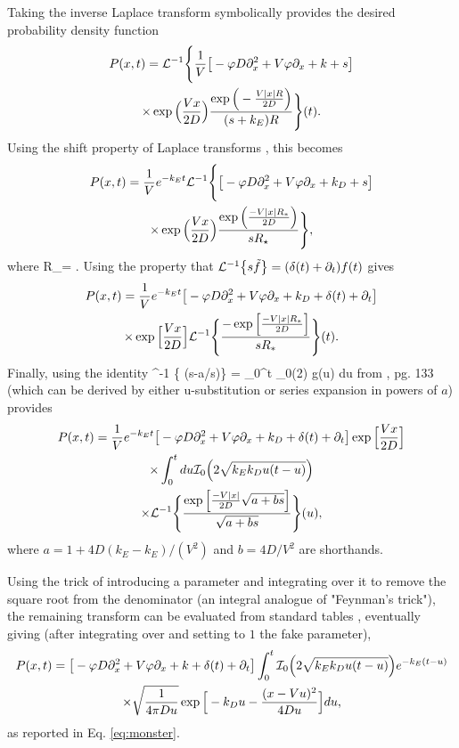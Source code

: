 Taking the inverse Laplace transform symbolically provides the desired probability density function
\begin{multline} P(x,t) = \mathcal{L}^{-1}\Bigg\{ \frac{1}{V} \big[-\varphi D\partial_x^2 + V\varphi \partial_x + k + s \big] \\ \times \exp\Big(\frac{Vx}{2D}\Big) \frac{\exp\Big(-\frac{V|x|R}{2D} \Big)}{(s+k_E)R} \Bigg\}(t). \end{multline}
Using the shift property of Laplace transforms \citep[e.g.][]{Arfken1985}, this becomes
\begin{multline} P(x,t) = \frac{1}{V}e^{-k_E t} \mathcal{L}^{-1}\Bigg\{ \big[-\varphi D\partial_x^2 + V \varphi \partial_x + k_D + s\big] \\ \times \exp\Big(\frac{Vx}{2D}\Big) \frac{\exp\Big(\frac{-V|x|R_\ast}{2D}\Big)}{s R_\star} \Bigg\},\end{multline}
where 
\be R_\ast = . \ee
Using the property that $\mathcal{L}^{-1}\big\{s \tilde{f}\big\} = (\delta(t) + \partial_t)f(t)$ \citep{Arfken1985} gives
\begin{multline}
 P(x,t) = \frac{1}{V} e^{-k_E t} \big[ -\varphi D\partial_x^2 + V\varphi \partial_x + k_D + \delta(t) + \partial_t \big] \\ \times \exp\Big[\frac{Vx}{2D}\Big] \mathcal{L}^{-1}\Bigg\{ \frac{-\exp\Big[\frac{-V|x|R_\ast}{2D}\Big]}{sR_\ast} \Bigg\}(t).
\end{multline}
Finally, using the identity
\be {}^{-1} \Big\{  (s-a/s)\Big\} = \int_0^t _0\Big(2\Big) g(u) du
\ee
from \citet{Bateman1953}, pg. 133 (which can be derived by either u-substitution or series expansion in powers of $a$) provides
\begin{multline}  P(x,t) = \frac{1}{V} e^{-k_E t}  \big[ -\varphi D\partial_x^2 + V\varphi \partial_x + k_D + \delta(t) + \partial_t \big] \exp\Big[\frac{Vx}{2D}\Big]\\ \times \int_0^t du \mathcal{I}_0\Big( 2 \sqrt{k_Ek_D u(t-u)}\Big) \\ \times \mathcal{L}^{-1}\Bigg\{ \frac{\exp\Big[ \frac{-V|x|}{2D}\sqrt{a+b s}\Big]}{\sqrt{a + b s}}\Bigg\}(u) , \label{eq:magic}\end{multline}
where $a = 1 + 4D(k_E-k_E)/(V^2)$ and $b = 4D/V^2$ are shorthands.

Using the trick of introducing a parameter and integrating over it to remove the square root from the denominator (an integral analogue of "Feynman's trick"), the remaining transform can be evaluated from standard tables \citep{Prudnikov1992a}, eventually giving (after integrating over and setting to $1$ the fake parameter),
\begin{multline} P(x,t) = \big[-\varphi D\partial_x^2 + V\varphi \partial_x + k + \delta(t)+ \partial_t \big]\int_0^t \mathcal{I}_0\Big( 2 \sqrt{k_Ek_D u(t-u)}\Big) e^{-k_E(t-u)} \\ \times \sqrt{ \frac{1}{4\pi D u}} \exp\Big[-k_D u - \frac{(x-Vu)^2}{4Du}\Big] du, \end{multline}
as reported in Eq. \ref{eq:monster}.


